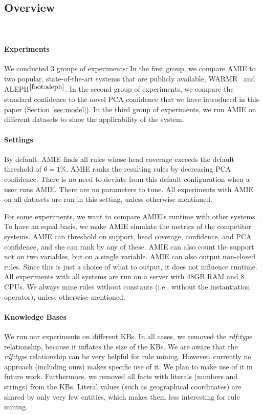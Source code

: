 
\ \\[-1.0cm]
\subsection{Overview}\ \\[-0.7cm]
\label{eval}

\paragraph{Experiments} We conducted 3 groups of experiments: In the first group, we compare AMIE to two popular, state-of-the-art systems that are publicly available, WARMR~\cite{DehToi99,DehToi00} and ALEPH$^{\ref{foot:aleph}}$. 
In the second group of experiments, we compare the standard confidence to the novel PCA confidence that we have introduced in this paper (Section \ref{sec:model}).
In the third group of experiments, we run AMIE on different datasets to show the applicability of the system.

\paragraph{Settings} By default, AMIE finds all rules whose head coverage exceeds the default threshold of $\theta=1\%$. AMIE ranks the resulting rules by decreasing PCA confidence. There is no need to deviate from this default configuration when a user runs AMIE. There are no parameters to tune. All experiments with AMIE on all datasets are run in this setting, unless otherwise mentioned. 

For some experiments, we want to compare AMIE's runtime with other systems. To have an equal basis, we make AMIE simulate the metrics of the competitor systems. AMIE can threshold on support, head coverage, confidence, and PCA confidence, and she can rank by any of these. AMIE can also count the support not on two variables, but on a single variable. AMIE can also output non-closed rules. Since this is just a choice of what to output, it does not influence runtime.
All experiments with all systems are run on a server with 48GB RAM and 8 CPUs. We always mine rules without constants (i.e., without the instantiation operator), unless otherwise mentioned. 

\paragraph{Knowledge Bases} We run our experiments on different KBs. In all cases, we removed the \emph{rdf:type} relationship, because it inflates the size of the KBs. We are aware that the \emph{rdf:type} relationship can be very helpful for rule mining. However, currently no approach (including ours) makes specific use of it. We plan to make use of it in future work. Furthermore, we removed all facts with literals (numbers and strings) from the KBs. Literal values (such as geographical coordinates) are shared by only very few entities, which makes them less interesting for rule mining.

